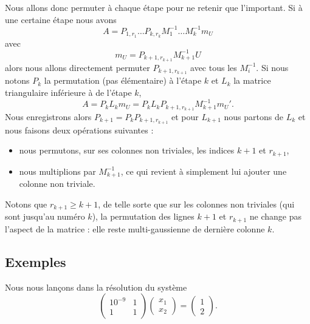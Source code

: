 Nous allons donc permuter à chaque étape pour ne retenir que l'important. Si à une certaine étape nous avons
\begin{equation}
	A=P_{1,r_1}\ldots P_{k,r_k}M_1^{-1}\ldots M_k^{-1} m_U
\end{equation}
avec
\begin{equation}
	m_U=P_{k+1,r_{k+1}}M_{k+1}^{-1}U
\end{equation}
alors nous allons directement permuter \( P_{k+1,r_{k+1}}\) avec tous les \( M_i^{-1}\). Si nous notons \( P_k\) la permutation (pas élémentaire) à l'étape \( k\) et \( L_k\) la matrice triangulaire inférieure à de l'étape \( k\),
\begin{equation}
	A=P_kL_km_U=P_kL_kP_{k+1,r_{k+1}}M_{k+1}^{-1}m_U'.
\end{equation}
Nous enregistrons alors \( P_{k+1}=P_kP_{k+1,r_{k+1}}\) et pour \( L_{k+1}\) nous partons de \( L_k\) et nous faisons deux opérations suivantes :
\begin{itemize}
	\item nous permutons, sur ses colonnes non triviales, les indices \( k+1\) et \( r_{k+1}\),
	\item nous multiplions par \( M_{k+1}^{-1}\), ce qui revient à simplement lui ajouter une colonne non triviale.
\end{itemize}
Notons que \( r_{k+1}\geq k+1\), de telle sorte que sur les colonnes non triviales (qui sont jusqu'au numéro \( k\)), la permutation des lignes \( k+1\) et \( r_{k+1}\) ne change pas l'aspect de la matrice : elle reste multi-gaussienne de dernière colonne \( k\).

\subsection{Exemples}

Nous nous lançons dans la résolution du système
\begin{equation}
	\begin{pmatrix}
		10^{-9} & 1 \\
		1       & 1
	\end{pmatrix}\begin{pmatrix}
		x_1 \\
		x_2
	\end{pmatrix}=\begin{pmatrix}
		1 \\
		2
	\end{pmatrix}.
\end{equation}

